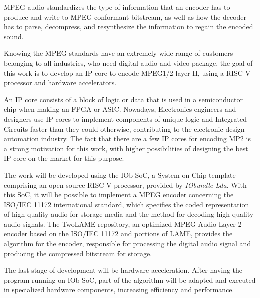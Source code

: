 
MPEG audio standardizes the type of information that an encoder has to produce and write to MPEG conformant bitstream, as well as how the decoder has to parse, decompress, and resynthesize the information to regain the encoded sound.


Knowing the MPEG standards have an extremely wide range of customers belonging to all industries, who need digital audio and video package, the goal of this work is to develop an IP core to encode MPEG1/2 layer II, using a RISC-V processor and hardware accelerators.

An IP core consists of a block of logic or data that is used in a semiconductor chip when making an FPGA or ASIC.
Nowadays, Electronics engineers and designers use IP cores to implement components of unique logic and Integrated Circuits faster than they could otherwise, contributing to the electronic design automation industry. The fact that there are a few IP cores for encoding MP2 is a strong motivation for this work, with higher possibilities of designing the best IP core on the market for this purpose.

The work will be developed using the IOb-SoC, a System-on-Chip template comprising an open-source RISC-V processor, provided by \textit{IObundle Lda}. 
With this SoC, it will be possible to implement a MPEG encoder concerning the ISO/IEC 11172 international standard, which specifies the coded representation of high-quality audio for storage media and the method for decoding high-quality audio signals. The TwoLAME repository, an optimized MPEG Audio Layer 2 encoder based on the ISO/IEC 11172 and portions of LAME, provides the algorithm for the encoder, responsible for processing the digital audio signal and producing the compressed bitstream for storage. 

The last stage of development will be hardware acceleration. After having the program running on IOb-SoC, part of the algorithm will be adapted and executed in specialized hardware components, increasing efficiency and performance.